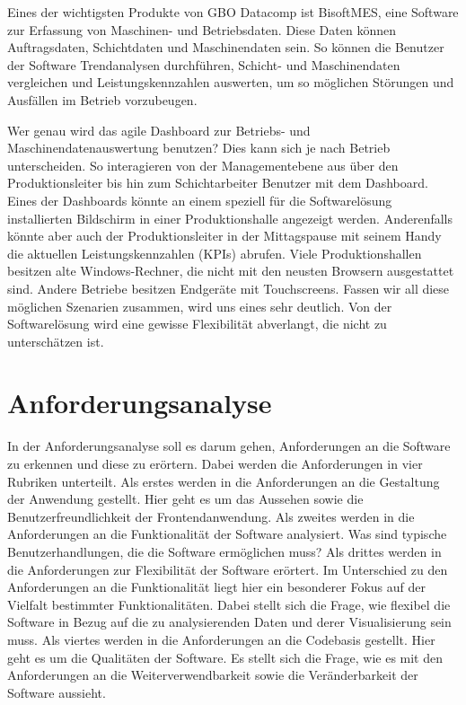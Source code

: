 Eines der wichtigsten Produkte von GBO Datacomp ist BisoftMES, eine Software zur Erfassung von
Maschinen- und Betriebsdaten. Diese Daten können Auftragsdaten, Schichtdaten und Maschinendaten sein.
So können die Benutzer der Software Trendanalysen durchführen, Schicht- und Maschinendaten vergleichen und
Leistungskennzahlen auswerten, um so möglichen Störungen und Ausfällen im Betrieb vorzubeugen.

Wer genau wird das agile Dashboard zur Betriebs- und Maschinendatenauswertung
benutzen? Dies kann sich je nach Betrieb unterscheiden. So interagieren von der
Managementebene aus über den Produktionsleiter bis hin zum Schichtarbeiter Benutzer mit dem
Dashboard. Eines der Dashboards könnte an einem speziell für die Softwarelösung
installierten Bildschirm in einer Produktionshalle angezeigt werden. Anderenfalls könnte aber
auch der Produktionsleiter in der Mittagspause mit seinem Handy die aktuellen Leistungskennzahlen 
(KPIs) abrufen. Viele Produktionshallen besitzen alte Windows-Rechner, die nicht
mit den neusten Browsern ausgestattet sind. Andere Betriebe besitzen Endgeräte mit Touchscreens.
Fassen wir all diese möglichen Szenarien zusammen, wird uns eines sehr deutlich. Von der
Softwarelösung wird eine gewisse Flexibilität abverlangt, die nicht zu unterschätzen ist.

\section{Anforderungsanalyse}
\label{sec:anforderungsanalyse}

In der Anforderungsanalyse soll es darum gehen, Anforderungen an die Software zu erkennen
und diese zu erörtern. Dabei werden die Anforderungen in vier Rubriken unterteilt. Als erstes werden 
in  die Anforderungen an die Gestaltung der Anwendung
gestellt. Hier geht es um das Aussehen sowie die Benutzerfreundlichkeit der Frontendanwendung.
Als zweites werden in  die Anforderungen an die Funktionalität der
Software analysiert. Was sind typische Benutzerhandlungen, die die Software ermöglichen
muss? Als drittes werden in  die Anforderungen zur Flexibilität
der Software erörtert. Im Unterschied zu den Anforderungen an die Funktionalität liegt hier
ein besonderer Fokus auf der Vielfalt bestimmter Funktionalitäten. Dabei stellt sich die Frage,
wie flexibel die Software in Bezug auf die zu analysierenden Daten und derer Visualisierung sein muss.
Als viertes werden in  die Anforderungen an die Codebasis gestellt.
Hier geht es um die Qualitäten der Software. Es stellt sich die Frage, wie es mit den
Anforderungen an die Weiterverwendbarkeit sowie die Veränderbarkeit der Software aussieht.

